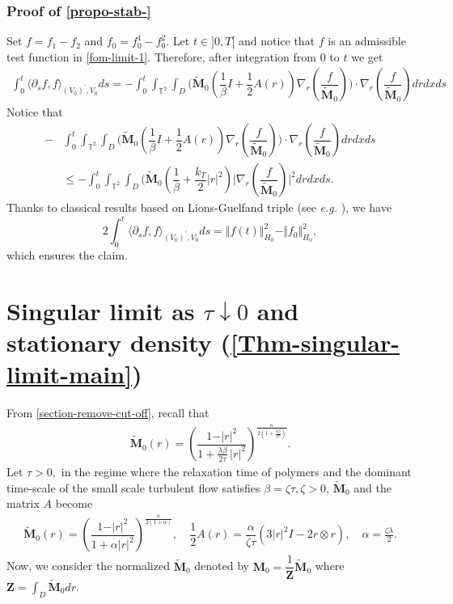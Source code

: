 \documentclass[a4paper,12pt, reqno]{amsart}
\begin{document}
  \subsubsection*{Proof of \autoref{propo-stab-}}
  Set $f=f_1-f_2$ and $f_0=f_0^1-f_0^2$.
    Let  $t\in ]0,T[$ and notice that $f$ is an admissible test function in \eqref{fom-limit-1}. Therefore, after integration from $0$ to $t$ we get 
       \begin{align*}
        \int_0^t \langle\partial_s f,f\rangle_{(V_0)^\prime,V_0} ds=-\int_0^t\int_{\mathbb{T}^2}\int_D\bigl(\widetilde{\mathbf{M}}_0 (\dfrac{1}{\beta}I+\dfrac{1}{2}A(r))\nabla_r(\dfrac{f}{\widetilde{\mathbf{M}}_0})\bigr)\cdot \nabla_r\left(\dfrac{f}{\widetilde{\mathbf{M}}_0}\right) drdxds 
\end{align*}
Notice that 
\begin{align*}
    -&\int_0^t\int_{\mathbb{T}^2}\int_D\bigl(\widetilde{\mathbf{M}}_0 (\dfrac{1}{\beta}I+\dfrac{1}{2}A(r))\nabla_r(\dfrac{f}{\widetilde{\mathbf{M}}_0})\bigr)\cdot \nabla_r\left(\dfrac{f}{\widetilde{\mathbf{M}}_0}\right) drdxds\\&\leq -\int_0^t\int_{\mathbb{T}^2}\int_D\bigl(\widetilde{\mathbf{M}}_0 (\dfrac{1}{\beta}+\dfrac{k_T}{2}\vert r\vert^2)\vert \nabla_r(\dfrac{f}{\widetilde{\mathbf{M}}_0})\vert^2 drdxds.
\end{align*}
Thanks to classical results based on  Lions-Guelfand
triple (see \textit{e.g.} \cite[Theorem 3.1.]{Lions-Magenes}), we have  $$2  \int_0^t \langle\partial_s f,f\rangle_{(V_0)^\prime,V_0} ds=\Vert f(t)\Vert_{H_0}^2-\Vert f_0\Vert_{H_0}^2,$$ 
which ensures the claim.
 
\section{Singular limit as $\tau \downarrow 0$ and stationary density (\autoref{Thm-singular-limit-main})}\label{Sec-singular-limit}
  From \autoref{section-remove-cut-off},   recall that
  \begin{align*}
  \widetilde{\mathbf{M}}_0(r)=\left(
\dfrac{1 - \vert r\vert^{2}}{1 + \frac{\lambda\beta}{2 \tau}\, \vert r\vert^{2}}
\right)^{\frac{\kappa}{2\left(1 + \frac{\lambda\beta}{2 \tau}\right)}}.
    \end{align*}
  Let $\tau>0,$      in the regime where the relaxation time of polymers and the dominant time-scale of the small scale turbulent flow satisfies $\beta=\zeta \tau, \zeta>0$,  $       \widetilde{\mathbf{M}}_0$ and the matrix $A$ become
        \begin{align*}
       \widetilde{\mathbf{M}}_0(r)=\left(
\dfrac{1 - \vert r\vert^{2}}{1 + \alpha \vert r\vert^{2}}
\right)^{\frac{\kappa}{2\left(1 + \alpha \right)}},\quad     \dfrac{1}{2}A(r)
		=\dfrac{\alpha}{\zeta \tau} (3 \left\vert r\right\vert^2I-2r\otimes r),\quad \alpha=\frac{\zeta\lambda}{2}.
        \end{align*}
        Now, we consider the normalized $\widetilde{\mathbf{M}}_0$ denoted by $\mathbf{M}_0=\dfrac{1}{\mathbf{Z}}\widetilde{\mathbf{M}}_0$ where $\mathbf{Z}=\int_D \widetilde{\mathbf{M}}_0 dr$.\\
        
\end{document}
